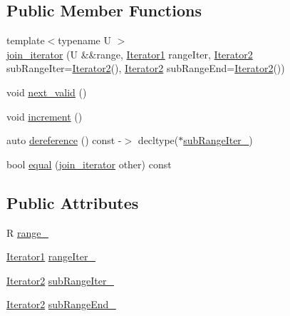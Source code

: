 \subsection*{Public Member Functions}
\begin{DoxyCompactItemize}
\item 
{\footnotesize template$<$typename U $>$ }\\\mbox{\hyperlink{structrah_1_1view_1_1join__iterator_a3413f5a25f3c86b1d85ad9335e6e8e39}{join\+\_\+iterator}} (U \&\&range, \mbox{\hyperlink{structrah_1_1view_1_1join__iterator_a8b71c6f25eee2915e2a8afc6e024196d}{Iterator1}} range\+Iter, \mbox{\hyperlink{structrah_1_1view_1_1join__iterator_ae03a066174f3422c70d0e3c22e68d9f7}{Iterator2}} sub\+Range\+Iter=\mbox{\hyperlink{structrah_1_1view_1_1join__iterator_ae03a066174f3422c70d0e3c22e68d9f7}{Iterator2}}(), \mbox{\hyperlink{structrah_1_1view_1_1join__iterator_ae03a066174f3422c70d0e3c22e68d9f7}{Iterator2}} sub\+Range\+End=\mbox{\hyperlink{structrah_1_1view_1_1join__iterator_ae03a066174f3422c70d0e3c22e68d9f7}{Iterator2}}())
\item 
void \mbox{\hyperlink{structrah_1_1view_1_1join__iterator_a6b3ef13305f87d011e2fecdb28b5dec6}{next\+\_\+valid}} ()
\item 
void \mbox{\hyperlink{structrah_1_1view_1_1join__iterator_a4f81464b6ff2707bb21d2bbd409c4f4d}{increment}} ()
\item 
auto \mbox{\hyperlink{structrah_1_1view_1_1join__iterator_af0786d44ba77073702b8d3c856232ffa}{dereference}} () const -\/$>$ decltype($\ast$\mbox{\hyperlink{structrah_1_1view_1_1join__iterator_a49b089a83af39b5f6893f57ad4a1d81c}{sub\+Range\+Iter\+\_\+}})
\item 
bool \mbox{\hyperlink{structrah_1_1view_1_1join__iterator_a76c4e51e7c191e189e01d15eff2b7055}{equal}} (\mbox{\hyperlink{structrah_1_1view_1_1join__iterator}{join\+\_\+iterator}} other) const
\end{DoxyCompactItemize}
\subsection*{Public Attributes}
\begin{DoxyCompactItemize}
\item 
R \mbox{\hyperlink{structrah_1_1view_1_1join__iterator_ad167fb9c44c21ad59d5acfa9031e9153}{range\+\_\+}}
\item 
\mbox{\hyperlink{structrah_1_1view_1_1join__iterator_a8b71c6f25eee2915e2a8afc6e024196d}{Iterator1}} \mbox{\hyperlink{structrah_1_1view_1_1join__iterator_a754b7bdee5ca2b23868a402c2c3cfcc2}{range\+Iter\+\_\+}}
\item 
\mbox{\hyperlink{structrah_1_1view_1_1join__iterator_ae03a066174f3422c70d0e3c22e68d9f7}{Iterator2}} \mbox{\hyperlink{structrah_1_1view_1_1join__iterator_a49b089a83af39b5f6893f57ad4a1d81c}{sub\+Range\+Iter\+\_\+}}
\item 
\mbox{\hyperlink{structrah_1_1view_1_1join__iterator_ae03a066174f3422c70d0e3c22e68d9f7}{Iterator2}} \mbox{\hyperlink{structrah_1_1view_1_1join__iterator_a70b890cac5aaa7c6f65f8c8efe369f0d}{sub\+Range\+End\+\_\+}}
\end{DoxyCompactItemize}


